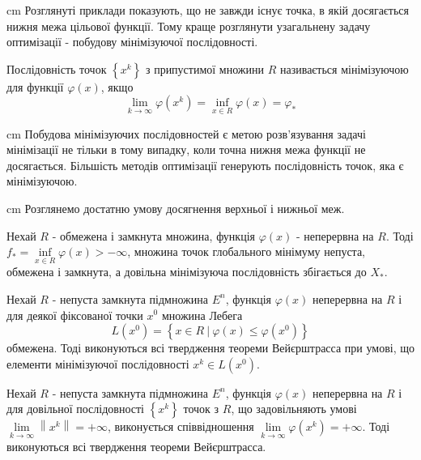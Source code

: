 \documentclass[12pt,a4paper]{article}
\begin{document}
\begin{flushleft}
\parbox{14,5 cm}{ cm Розглянуті приклади показують, що не завжди існує точка, в якій досягається нижня межа цільової функції. Тому краще розглянути узагальнену задачу оптимізації - побудову мінімізуючої послідовності.}
\end{flushleft}
\begin{law4}
Послідовність точок $\left\{ {x}^k\right\}$ з припустимої множини $R$ називається мінімізуючою для функції $\varphi\left(x\right)$, якщо $$\lim_{k\rightarrow\infty}{\varphi\left({x}^k\right)}=\inf_{x\in R}{\varphi\left(x\right)}={\varphi}_*$$
\end{law4}
\begin{flushleft}
\parbox{14,5 cm}{ cm Побудова мінімізуючих послідовностей є метою розв'язування задачі мінімізації не тільки в тому випадку, коли точна нижня межа функції не досягається. Більшість методів оптимізації генерують послідовність точок, яка є мінімізуючою.}
\end{flushleft}
\begin{flushleft}
\parbox{14,5 cm}{ cm Розглянемо достатню умову досягнення верхньої і нижньої меж.}
\end{flushleft}
\begin{theorem}[Вейєрштрасса]\label{thVeyer}
Нехай $R$ - обмежена і замкнута множина, функція $\varphi\left(x\right)$ - неперервна на  $R$. Тоді ${f}_*=\inf\limits_{x \in R}{\varphi\left(x\right)}>-\infty$, множина точок глобального мінімуму непуста, обмежена і замкнута, а довільна мінімізуюча послідовність збігається до ${X}_*$.
\end{theorem}
\begin{consequence}
Нехай $R$ - непуста замкнута підмножина ${E}^n$, функція $\varphi\left(x\right)$ неперервна на $R$ і для деякої фіксованої точки ${x}^0$ множина Лебега $$L\left({x}^0\right) = \left\{ x\in R\ |\ \varphi\left(x\right)\le\varphi\left({x}^0\right)\right\}$$ обмежена. Тоді виконуються всі твердження теореми Вейєрштрасса при умові, що елементи мінімізуючої послідовності ${x}^k\in L\left({x}^0\right)$.
\end{consequence}
\begin{consequence1}
Нехай $R$ - непуста замкнута підмножина ${E}^n$, функція $\varphi\left(x\right)$ неперервна на $R$ і для довільної послідовності $\left\{ {x}^k\right\}$ точок з $R$, що задовільняють умові $\lim\limits_{k\rightarrow\infty}{\left\| {x}^k\right\|}=+\infty$, виконується співвідношення $\lim\limits_{k\rightarrow\infty}{\varphi\left({x}^k\right)}=+\infty$. Тоді виконуються всі твердження теореми Вейєрштрасса.
\end{consequence1}
\end{document}
